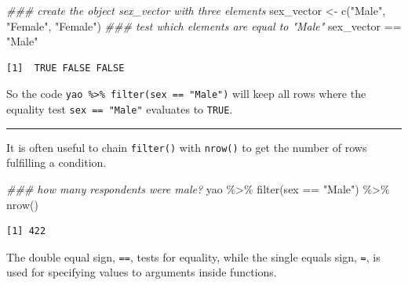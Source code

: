 \documentclass[
  letterpaper,
  DIV=11,
  numbers=noendperiod]{scrreprt}
\newenvironment{Shaded}{\begin{snugshade}}{\end{snugshade}}
\newcommand{\DocumentationTok}[1]{\textcolor[rgb]{0.37,0.37,0.37}{\textit{#1}}}
\newcommand{\FunctionTok}[1]{\textcolor[rgb]{0.28,0.35,0.67}{#1}}
\newcommand{\NormalTok}[1]{\textcolor[rgb]{0.00,0.23,0.31}{#1}}
\newcommand{\OtherTok}[1]{\textcolor[rgb]{0.00,0.23,0.31}{#1}}
\newcommand{\SpecialCharTok}[1]{\textcolor[rgb]{0.37,0.37,0.37}{#1}}
\newcommand{\StringTok}[1]{\textcolor[rgb]{0.13,0.47,0.30}{#1}}
\begin{document}
\begin{Shaded}
\begin{Highlighting}[]
\DocumentationTok{\#\#\# create the object \textasciigrave{}sex\_vector\textasciigrave{} with three elements}
\NormalTok{sex\_vector }\OtherTok{\textless{}{-}} \FunctionTok{c}\NormalTok{(}\StringTok{"Male"}\NormalTok{, }\StringTok{"Female"}\NormalTok{, }\StringTok{"Female"}\NormalTok{)}
\DocumentationTok{\#\#\# test which elements are equal to "Male"}
\NormalTok{sex\_vector }\SpecialCharTok{==} \StringTok{"Male"}
\end{Highlighting}
\end{Shaded}

\begin{verbatim}
[1]  TRUE FALSE FALSE
\end{verbatim}

So the code \texttt{yao\ \%\textgreater{}\%\ filter(sex\ ==\ "Male")}
will keep all rows where the equality test \texttt{sex\ ==\ "Male"}
evaluates to \texttt{TRUE}.

\begin{center}\rule{0.5\linewidth}{0.5pt}\end{center}

It is often useful to chain \texttt{filter()} with \texttt{nrow()} to
get the number of rows fulfilling a condition.

\begin{Shaded}
\begin{Highlighting}[]
\DocumentationTok{\#\#\# how many respondents were male?}
\NormalTok{yao }\SpecialCharTok{\%\textgreater{}\%} 
  \FunctionTok{filter}\NormalTok{(sex }\SpecialCharTok{==} \StringTok{"Male"}\NormalTok{) }\SpecialCharTok{\%\textgreater{}\%} 
  \FunctionTok{nrow}\NormalTok{()}
\end{Highlighting}
\end{Shaded}

\begin{verbatim}
[1] 422
\end{verbatim}

\begin{tcolorbox}[enhanced jigsaw, title=\textcolor{quarto-callout-note-color}{\faInfo}\hspace{0.5em}{Key Point}, colbacktitle=quarto-callout-note-color!10!white, leftrule=.75mm, arc=.35mm, opacityback=0, bottomrule=.15mm, rightrule=.15mm, toptitle=1mm, breakable, toprule=.15mm, colback=white, coltitle=black, colframe=quarto-callout-note-color-frame, bottomtitle=1mm, titlerule=0mm, left=2mm, opacitybacktitle=0.6]

The double equal sign, \texttt{==}, tests for equality, while the single
equals sign, \texttt{=}, is used for specifying values to arguments
inside functions.

\end{tcolorbox}
\end{document}
